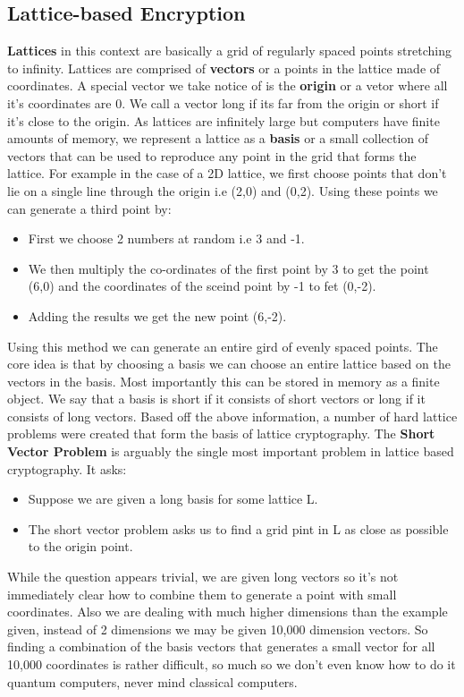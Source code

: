 \documentclass[10pt,a4paper]{IEEEtran}
\begin{document}
\subsection{Lattice-based Encryption}
\textbf{Lattices} in this context are basically a grid of regularly spaced points stretching to infinity. Lattices are comprised of \textbf{vectors} or a points in the lattice made of coordinates. A special vector we take notice of is the \textbf{origin} or a vetor where all it's coordinates are 0. We call a vector long if its far from the origin or short if it's close to the origin. As lattices are infinitely large but computers have finite amounts of memory, we represent a lattice as a \textbf{basis} or a small collection of vectors that can be used to reproduce any point in the grid that forms the lattice.
\newline
For example in the case of a 2D lattice, we first choose points that don't lie on a single line through the origin i.e (2,0) and (0,2). Using these points we can generate a third point by:
\begin{itemize}
\item First we choose 2 numbers at random i.e 3 and -1.
\item We then multiply the co-ordinates of the first point by 3 to get the point (6,0) and the coordinates of the sceind point by -1 to fet (0,-2).
\item Adding the results we get the new point (6,-2).
\end{itemize}
Using this method we can generate an entire gird of evenly spaced points. The core idea is that by choosing a basis we can choose an entire lattice based on the vectors in the basis. Most importantly this can be stored in memory as a finite object. We say that a basis is short if it consists of short vectors or long if it consists of long vectors.
\newline
\newline
Based off the above information, a number of hard lattice problems were created that form the basis of lattice cryptography. The \textbf{Short Vector Problem} is arguably the single most important problem in lattice based cryptography. It asks:
\begin{itemize}
\item Suppose we are given a long basis for some lattice L.
\item The short vector problem asks us to find a grid pint in L as close as possible to the origin point.
\end{itemize}
While the question appears trivial, we are given long vectors so it's not immediately clear how to combine them to generate a point with small coordinates. Also we are dealing with much higher dimensions than the example given, instead of 2 dimensions we may be given 10,000 dimension vectors. So finding a combination of the basis vectors that generates a small vector for all 10,000 coordinates is rather difficult, so much so we don't even know how to do it quantum computers, never mind classical computers.
\end{document}
